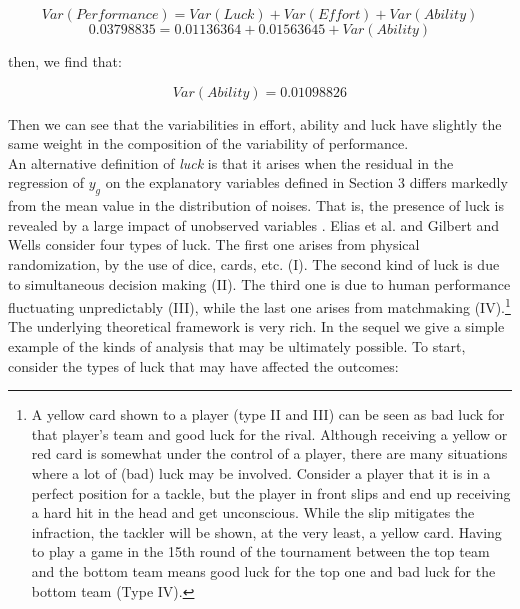 \documentclass[]{article}
\begin{document}
$$Var(Performance) = Var(Luck) + Var(Effort) + Var(Ability)$$
$$ 0.03798835 = 0.01136364 + 0.01563645 + Var(Ability)$$

\noindent then, we find that:

$$ Var(Ability) = 0.01098826 $$

Then we can see that the variabilities in effort, ability and luck have slightly the same weight in the composition of the variability of performance.\\



An alternative definition of {\em luck} is that it arises when the residual in the regression of $y_g$ on the explanatory variables defined in Section 3 differs markedly from the mean value in the distribution of noises. That is, the presence of luck is revealed by a large impact of unobserved variables \cite{mauboussin2012success}. Elias et al. \cite{elias2012characteristics} and Gilbert and Wells \cite{gilbert2019ludometrics} consider four types of luck. The first one arises from physical randomization, by the use of dice, cards, etc. (I). The second kind of luck is due to simultaneous decision making (II). The third one is due to human performance fluctuating unpredictably (III), while the last one arises from matchmaking (IV).\footnote{A yellow card shown to a player (type II and III) can be seen as bad luck for that player's team and good luck for the rival. Although receiving a yellow or red card is somewhat under the control of a player, there are many situations where a lot of (bad) luck may be involved. Consider a player that it is in a perfect position for a tackle, but the player in front slips and end up receiving a hard hit in the head and get unconscious. While the slip mitigates the infraction, the tackler will be shown, at the very least, a yellow card. Having to play a game in the 15th round of the tournament between the top team and the bottom team means good luck for the top one and bad luck for the bottom team (Type IV).} \\


The underlying theoretical framework is very rich. In the sequel we give a simple example of the kinds of analysis that may be ultimately possible. To start, consider the types of luck that may have affected the outcomes:
\end{document}
